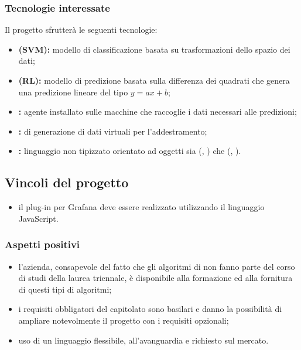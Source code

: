 		\subsubsection{Tecnologie interessate}
			Il progetto sfrutterà le seguenti tecnologie:
			\begin{itemize}
			  \item \textbf{ (SVM):} modello di classificazione basata su trasformazioni dello spazio dei dati;
			  \item \textbf{ (RL):} modello di predizione basata sulla differenza dei quadrati che genera una predizione lineare del tipo \(y=ax+b\);
				\item \textbf{:} agente installato sulle macchine che raccoglie i dati necessari alle predizioni;
				\item \textbf{:}  di generazione di dati virtuali per l'addestramento;
			  \item \textbf{:} linguaggio non tipizzato orientato ad oggetti sia  (, ) che  (, ).
			\end{itemize}

		\subsection{Vincoli del progetto}
			\begin{itemize}
				\item il plug-in per Grafana deve essere realizzato utilizzando il linguaggio JavaScript.
			\end{itemize}

		\subsubsection{Aspetti positivi}
			\begin{itemize}
			  \item l'azienda, consapevole del fatto che gli algoritmi di  non fanno parte del corso di studi della laurea triennale, è disponibile alla formazione ed alla fornitura di questi tipi di algoritmi;
			  \item i requisiti obbligatori del capitolato sono basilari e danno la possibilità di ampliare notevolmente il progetto con i requisiti opzionali;
			  \item uso di un linguaggio flessibile, all'avanguardia e richiesto sul mercato.
			\end{itemize}

